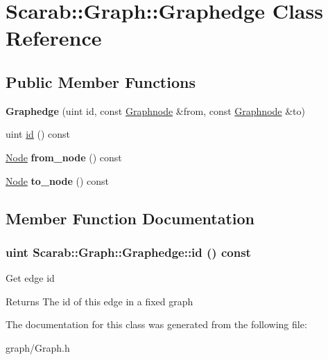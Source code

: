 \hypertarget{class_scarab_1_1_graph_1_1_graphedge}{
\section{Scarab::Graph::Graphedge Class Reference}
\label{class_scarab_1_1_graph_1_1_graphedge}
}
\subsection*{Public Member Functions}
\begin{DoxyCompactItemize}
\item 
\hypertarget{class_scarab_1_1_graph_1_1_graphedge_aea165d2e0b46a46180f5e684df52abdf}{
{\bfseries Graphedge} (uint id, const \hyperlink{class_scarab_1_1_graph_1_1_graphnode}{Graphnode} \&from, const \hyperlink{class_scarab_1_1_graph_1_1_graphnode}{Graphnode} \&to)}
\label{class_scarab_1_1_graph_1_1_graphedge_aea165d2e0b46a46180f5e684df52abdf}

\item 
uint \hyperlink{class_scarab_1_1_graph_1_1_graphedge_af4e2b922eb0db014aa6af45ef911e47c}{id} () const 
\item 
\hypertarget{class_scarab_1_1_graph_1_1_graphedge_a10760ab9034b358f9bd4aa28c44117d5}{
\hyperlink{class_scarab_1_1_graph_1_1_graphnode}{Node} {\bfseries from\_\-node} () const }
\label{class_scarab_1_1_graph_1_1_graphedge_a10760ab9034b358f9bd4aa28c44117d5}

\item 
\hypertarget{class_scarab_1_1_graph_1_1_graphedge_ae5b1fccfa8a11847b8be2a27690243f0}{
\hyperlink{class_scarab_1_1_graph_1_1_graphnode}{Node} {\bfseries to\_\-node} () const }
\label{class_scarab_1_1_graph_1_1_graphedge_ae5b1fccfa8a11847b8be2a27690243f0}

\end{DoxyCompactItemize}


\subsection{Member Function Documentation}
\hypertarget{class_scarab_1_1_graph_1_1_graphedge_af4e2b922eb0db014aa6af45ef911e47c}{
\subsubsection[{id}]{\setlength{\rightskip}{0pt plus 5cm}uint Scarab::Graph::Graphedge::id () const}}
\label{class_scarab_1_1_graph_1_1_graphedge_af4e2b922eb0db014aa6af45ef911e47c}
Get edge id

\begin{DoxyReturn}{Returns}
The id of this edge in a fixed graph 
\end{DoxyReturn}


The documentation for this class was generated from the following file:\begin{DoxyCompactItemize}
\item 
graph/Graph.h\end{DoxyCompactItemize}
